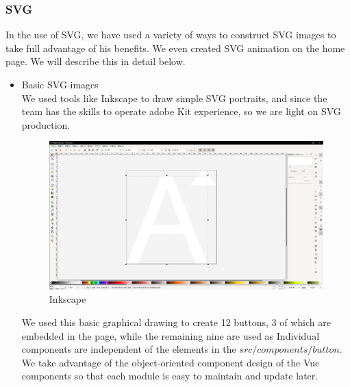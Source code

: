 \documentclass[11pt]{article}
\begin{document}
\begin{spacing}{1.0}
	\subsubsection{SVG}
	In the use of SVG, we have used a variety of ways to construct SVG images to take full advantage of his benefits. We even created SVG  animation on the home page. We will describe this in detail below.
	\begin{itemize}
		\item Basic SVG images\\
		We used tools like Inkscape to draw simple SVG portraits, and since the team has the skills to operate adobe Kit experience, so we are light on SVG production. 
		\begin{figure}[H]
			\centering
			\includegraphics[scale=.3]{figures/svg1.png}
			\caption{Inkscape}
			\label{fig:1}
		\end{figure}
	We used this basic graphical drawing to create 12 buttons, 3 of which are embedded in the page, while the remaining nine are used as Individual components are independent of the elements in the $src/components/button$. We take advantage of the object-oriented component design of the Vue components so that each module is easy to maintain and update later.
	\begin{figure}[H]
		\centering

\end{figure}
\end{itemize}
\end{spacing}
\end{document}
